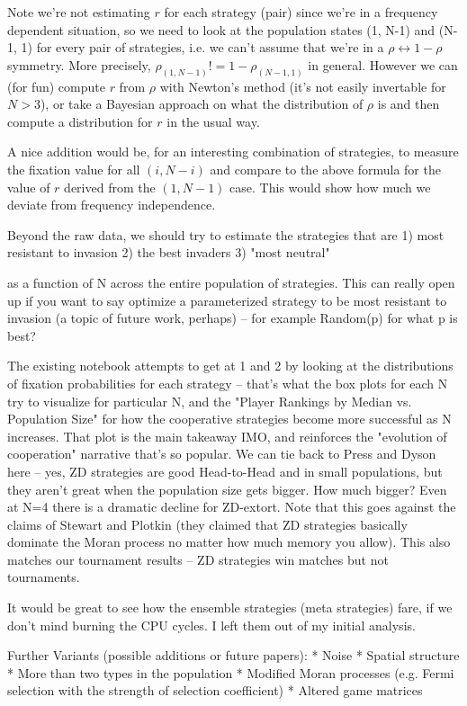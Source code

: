 \documentclass{article}
\begin{document}
Note we're not estimating $r$ for each strategy (pair) since we're in a frequency dependent situation, so we need to look at the population states (1, N-1) and (N-1, 1) for every pair of strategies, i.e. we can't assume that we're in a $\rho \leftrightarrow 1-\rho$ symmetry. More precisely, $\rho_{(1, N-1)} != 1 - \rho_{(N-1, 1)}$ in general. However we can (for fun) compute $r$ from $\rho$ with Newton's method (it's not easily invertable for $N > 3$), or take a Bayesian approach on what the distribution of $\rho$ is and then compute a distribution for $r$ in the usual way.

A nice addition would be, for an interesting combination of strategies, to measure the fixation value for all $(i, N-i)$ and compare to the above formula for the value of $r$ derived from the $(1, N-1)$ case. This would show how much we deviate from frequency independence.

Beyond the raw data, we should try to estimate the strategies that are
1) most resistant to invasion
2) the best invaders
3) "most neutral"

as a function of N across the entire population of strategies. This can really open up if you want to say optimize a parameterized strategy to be most resistant to invasion (a topic of future work, perhaps) -- for example Random(p) for what p is best?

The existing notebook attempts to get at 1 and 2 by looking at the distributions of fixation probabilities for each strategy -- that's what the box plots for each N try to visualize for particular N, and the "Player Rankings by Median vs. Population Size" for how the cooperative strategies become more successful as N increases. That plot is the main takeaway IMO, and reinforces the "evolution of cooperation" narrative that's so popular. We can tie back to Press and Dyson here -- yes, ZD strategies are good Head-to-Head and in small populations, but they aren't great when the population size gets bigger. How much bigger? Even at N=4 there is a dramatic decline for ZD-extort. Note that this goes against the claims of Stewart and Plotkin (they claimed that ZD strategies basically dominate the Moran process no matter how much memory you allow). This also matches our tournament results -- ZD strategies win matches but not tournaments.

It would be great to see how the ensemble strategies (meta strategies) fare, if we don't mind burning the CPU cycles. I left them out of my initial analysis.

Further Variants (possible additions or future papers):
* Noise
* Spatial structure
* More than two types in the population
* Modified Moran processes (e.g. Fermi selection with the strength of selection coefficient)
* Altered game matrices
\end{document}
